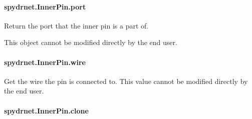 \documentclass[letterpaper,10pt,english,openany,oneside]{sphinxmanual}
\begin{document}
\paragraph{spydrnet.InnerPin.port}
\label{\detokenize{reference/classes/generated/spydrnet.InnerPin.port:spydrnet-innerpin-port}}\label{\detokenize{reference/classes/generated/spydrnet.InnerPin.port::doc}}

\begin{fulllineitems}
\label{\detokenize{reference/classes/generated/spydrnet.InnerPin.port:spydrnet.InnerPin.port}}
Return the port that the inner pin is a part of.

This object cannot be modified directly by the end user.

\end{fulllineitems}



\paragraph{spydrnet.InnerPin.wire}
\label{\detokenize{reference/classes/generated/spydrnet.InnerPin.wire:spydrnet-innerpin-wire}}\label{\detokenize{reference/classes/generated/spydrnet.InnerPin.wire::doc}}

\begin{fulllineitems}
\label{\detokenize{reference/classes/generated/spydrnet.InnerPin.wire:spydrnet.InnerPin.wire}}
Get the wire the pin is connected to. This value cannot be modified directly by the end user.

\end{fulllineitems}



\paragraph{spydrnet.InnerPin.clone}
\label{\detokenize{reference/classes/generated/spydrnet.InnerPin.clone:spydrnet-innerpin-clone}}\label{\detokenize{reference/classes/generated/spydrnet.InnerPin.clone::doc}}
\end{document}
